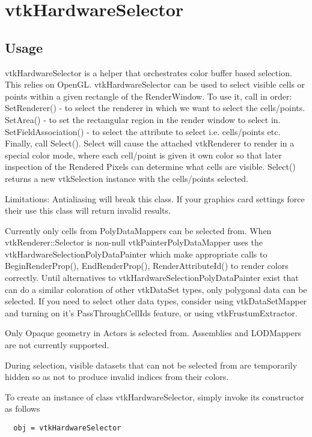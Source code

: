 \section{vtkHardwareSelector}

\subsection{Usage}

 vtkHardwareSelector is a helper that orchestrates color buffer based
 selection. This relies on OpenGL. 
 vtkHardwareSelector can be used to select visible cells or points within a
 given rectangle of the RenderWindow.
 To use it, call in order:
  SetRenderer() - to select the renderer in which we
 want to select the cells/points.
  SetArea() - to set the rectangular region in the render window to select
 in.
  SetFieldAssociation() -  to select the attribute to select i.e.
 cells/points etc. 
  Finally, call Select().
 Select will cause the attached vtkRenderer to render in a special color mode,
 where each cell/point is given it own color so that later inspection of the 
 Rendered Pixels can determine what cells are visible. Select() returns a new
 vtkSelection instance with the cells/points selected.

 Limitations:
 Antialiasing will break this class. If your graphics card settings force
 their use this class will return invalid results.

 Currently only cells from PolyDataMappers can be selected from. When 
 vtkRenderer::Selector is non-null vtkPainterPolyDataMapper uses the
 vtkHardwareSelectionPolyDataPainter which make appropriate calls to
 BeginRenderProp(), EndRenderProp(), RenderAttributeId() to render colors
 correctly. Until alternatives to vtkHardwareSelectionPolyDataPainter
 exist that can do a similar coloration of other vtkDataSet types, only
 polygonal data can be selected. If you need to select other data types,
 consider using vtkDataSetMapper and turning on it's PassThroughCellIds 
 feature, or using vtkFrustumExtractor.

 Only Opaque geometry in Actors is selected from. Assemblies and LODMappers 
 are not currently supported. 

 During selection, visible datasets that can not be selected from are
 temporarily hidden so as not to produce invalid indices from their colors.


To create an instance of class vtkHardwareSelector, simply
invoke its constructor as follows
\begin{verbatim}
  obj = vtkHardwareSelector
\end{verbatim}
